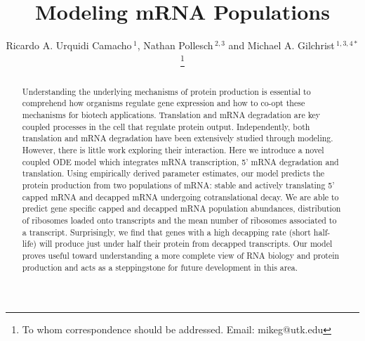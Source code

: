 \documentclass[a4,center,fleqn,nocrop]{NAR}
\begin{document}
\title{Modeling mRNA Populations}
\author{%
Ricardo A. Urquidi Camacho\,$^{1}$,
Nathan Pollesch\,$^{2, 3}$
and Michael A. Gilchrist\,$^{1, 3, 4*}$%
\footnote{To whom correspondence should be addressed.
Email: mikeg@utk.edu}}

\address{%
$^{1}$Genome Science and Technology Program, University of Tennessee, Knoxville, TN 37996, USA\,
$^{2}$Department of Mathematics, University of Tennessee,  Knoxville, TN 37996, USA\,
$^{3}$Department of Ecology and Evolutionary Biology, University of Tennessee, Knoxville, TN 37996, USA\,
and
$^{4}$National Institute for Mathematical and Biological Synthesis, University of Tennessee, Knoxville, TN 37996, USA}



\maketitle
\begin{abstract}
Understanding the underlying mechanisms of protein production is essential to comprehend how organisms regulate gene expression and how to co-opt these mechanisms for biotech applications. Translation and mRNA degradation are key coupled processes in the cell that regulate protein output. Independently, both translation and mRNA degradation have been extensively studied through modeling. However, there is little work exploring their interaction. Here we introduce a novel coupled ODE model which integrates mRNA transcription, 5' mRNA degradation and translation. Using empirically derived parameter estimates, our model predicts the protein production from two populations of mRNA: stable and actively translating 5' capped mRNA and decapped mRNA undergoing cotranslational decay. We are able to predict gene specific capped and decapped mRNA population abundances, distribution of ribosomes loaded onto transcripts and the mean number of ribosomes associated to a transcript. Surprisingly, we find that genes with a high decapping rate (short half-life) will produce just under half their protein from decapped transcripts. Our model proves useful toward understanding a more complete view of RNA biology and protein production and acts as a steppingstone for future development in this area. 
 
\end{abstract}
\end{document}
